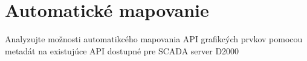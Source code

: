 \chapter{Automatické mapovanie}

Analyzujte možnosti automatikcého mapovania API grafikcých prvkov pomocou metadát na existujúce API dostupné pre SCADA server D2000

